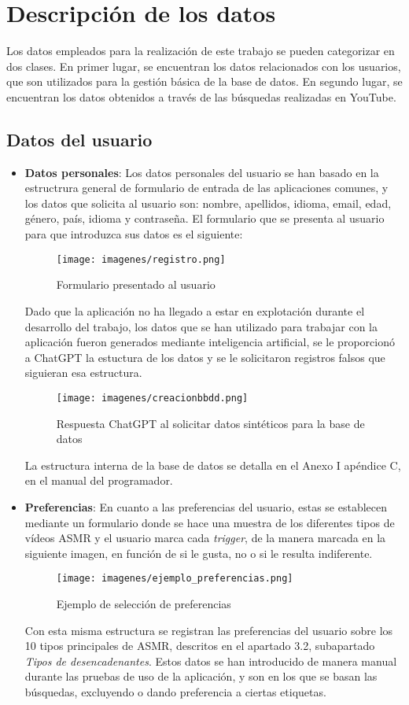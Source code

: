 \documentclass[a4paper,12pt,twoside]{memoir}
\begin{document}
\section{Descripción de los datos}
Los datos empleados para la realización de este trabajo se pueden categorizar en dos clases. En primer lugar, se encuentran los datos relacionados con los usuarios, que son utilizados para la gestión básica de la base de datos. En segundo lugar, se encuentran los datos obtenidos a través de las búsquedas realizadas en YouTube.
\subsection{Datos del usuario}
\begin{itemize}
    \item \textbf{Datos personales}: Los datos personales del usuario se han basado en la estructrura general de formulario de entrada de las aplicaciones comunes, y los datos que solicita al usuario son: nombre, apellidos, idioma, email, edad, género, país, idioma y contraseña. El formulario que se presenta al usuario para que introduzca sus datos es el siguiente: 
    \begin{figure}
        \centering
        \texttt{[image: imagenes/registro.png]} 
        \caption{Formulario presentado al usuario}
        \label{fig:ejemplo}
    \end{figure}
    Dado que la aplicación no ha llegado a estar en explotación durante el desarrollo del trabajo, los datos que se han utilizado para trabajar con la aplicación fueron generados mediante inteligencia artificial, se le proporcionó a ChatGPT la estuctura de los datos y se le solicitaron registros falsos que siguieran esa estructura.
    \begin{figure}
        \centering
        \texttt{[image: imagenes/creacionbbdd.png]} 
        \caption{Respuesta ChatGPT al solicitar datos sintéticos para la base de datos}
        \label{fig:ejemplo}
    \end{figure}

    La estructura interna de la base de datos se detalla en el Anexo I apéndice C, en el manual del programador.
    \item \textbf{Preferencias}: En cuanto a las preferencias del usuario, estas se establecen mediante un formulario donde se hace una muestra de los diferentes tipos de vídeos ASMR y el usuario marca cada \textit{trigger}, de la manera marcada en la siguiente imagen, en función de si le gusta, no o si le resulta indiferente. 
    \begin{figure}
        \centering
        \texttt{[image: imagenes/ejemplo\_preferencias.png]} 
        \caption{Ejemplo de selección de preferencias}
        \label{fig:ejemplo}
    \end{figure}
    Con esta misma estructura se registran las preferencias del usuario sobre los 10 tipos principales de ASMR, descritos en el apartado  3.2, subapartado \textit{Tipos de desencadenantes}. Estos datos se han introducido de manera manual durante las pruebas de uso de la aplicación, y son en los que se basan las búsquedas, excluyendo o dando preferencia a ciertas etiquetas.


\end{itemize}
\end{document}
